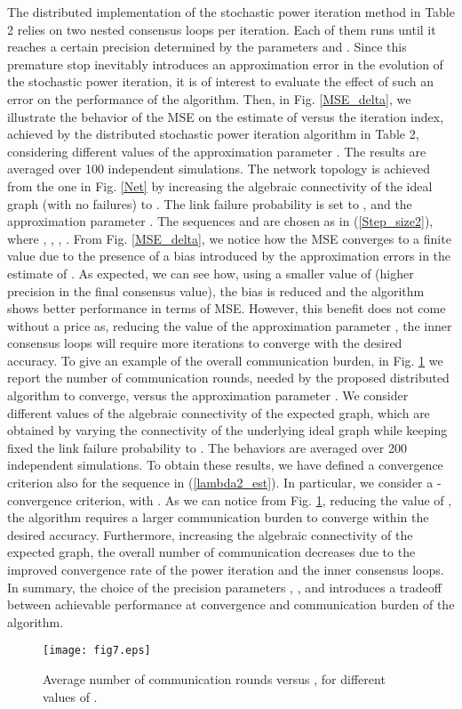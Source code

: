 \documentclass[10pt,twocolumn]{IEEEtran}
\begin{document}
 The distributed implementation of the stochastic power iteration method in Table 2 relies on two nested consensus loops per iteration. Each of them runs until it reaches a certain precision determined by the parameters  and . Since this premature stop inevitably introduces an approximation error in the evolution of the stochastic power iteration, it is of interest to evaluate the effect of such an error on the performance of the algorithm. Then, in Fig. \ref{MSE_delta}, we illustrate the behavior of the MSE on the estimate of  versus the iteration index, achieved by the distributed stochastic power iteration algorithm in Table 2, considering different values of the approximation parameter . The results are averaged over 100 independent simulations. The network topology is achieved from the one in Fig. \ref{Net} by increasing the algebraic connectivity of the ideal graph (with no failures) to . The link failure probability is set to , and the approximation parameter . The sequences  and  are chosen as in (\ref{Step_size2}), where , , , . From Fig. \ref{MSE_delta}, we notice how the MSE converges to a finite value due to the presence of a bias introduced by the approximation errors in the estimate of . As expected, we can see how, using a smaller value of  (higher precision in the final consensus value), the bias is reduced and the algorithm shows better performance in terms of MSE. However, this benefit does not come without a price as, reducing the value of the approximation parameter , the inner consensus loops will require more iterations to converge with the desired accuracy. To give an example of the overall communication burden, in Fig. \ref{Iter_delta} we report the number of communication rounds, needed by the proposed distributed algorithm to converge, versus the approximation parameter . We consider different values of the algebraic connectivity of the expected graph, which are obtained by varying the connectivity of the underlying ideal graph while keeping fixed the link failure probability to . The behaviors are averaged over 200 independent simulations. To obtain these results, we have defined a convergence criterion also for the sequence  in (\ref{lambda2_est}). In particular, we consider a -convergence criterion, with . As we can notice from Fig. \ref{Iter_delta}, reducing the value of , the algorithm requires a larger communication burden to converge within the desired accuracy. Furthermore, increasing the algebraic connectivity of the expected graph, the overall number of communication decreases due to the improved convergence rate of the power iteration and the inner consensus loops. In summary, the choice of the precision parameters , , and  introduces a tradeoff between achievable performance at convergence and communication burden of the algorithm.
\begin{figure}[t]
\centering
\texttt{[image: fig7.eps]}
  \caption{Average number of communication rounds versus , for different values of .}\label{Iter_delta}
\end{figure}
\end{document}
